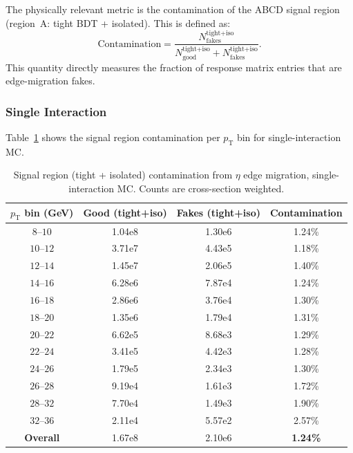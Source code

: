 \documentclass[11pt,letterpaper]{article}
\providecommand{\num}[1]{#1}  %
\newcommand{\pT}{\ensuremath{p_{\text{T}}}}
\begin{document}
The physically relevant metric is the contamination of the ABCD signal region
(region~A: tight BDT + isolated). This is defined as:
\begin{equation}
  \text{Contamination} = \frac{N_\text{fakes}^\text{tight+iso}}{N_\text{good}^\text{tight+iso} + N_\text{fakes}^\text{tight+iso}}.
  \label{eq:contamination}
\end{equation}
This quantity directly measures the fraction of response matrix entries that are
edge-migration fakes.

\subsubsection{Single Interaction}

Table~\ref{tab:signal_single} shows the signal region contamination per $\pT$
bin for single-interaction MC.

\begin{table}[htbp]
\centering
\caption{Signal region (tight + isolated) contamination from $\eta$ edge
  migration, single-interaction MC. Counts are cross-section weighted.}
\label{tab:signal_single}
\begin{tabular}{cccc}
\toprule
$\pT$ bin (GeV) & Good (tight+iso) & Fakes (tight+iso) & Contamination \\
\midrule
$8$--$10$   & \num{1.04e8} & \num{1.30e6} & 1.24\% \\
$10$--$12$  & \num{3.71e7} & \num{4.43e5} & 1.18\% \\
$12$--$14$  & \num{1.45e7} & \num{2.06e5} & 1.40\% \\
$14$--$16$  & \num{6.28e6} & \num{7.87e4} & 1.24\% \\
$16$--$18$  & \num{2.86e6} & \num{3.76e4} & 1.30\% \\
$18$--$20$  & \num{1.35e6} & \num{1.79e4} & 1.31\% \\
$20$--$22$  & \num{6.62e5} & \num{8.68e3} & 1.29\% \\
$22$--$24$  & \num{3.41e5} & \num{4.42e3} & 1.28\% \\
$24$--$26$  & \num{1.79e5} & \num{2.34e3} & 1.30\% \\
$26$--$28$  & \num{9.19e4} & \num{1.61e3} & 1.72\% \\
$28$--$32$  & \num{7.70e4} & \num{1.49e3} & 1.90\% \\
$32$--$36$  & \num{2.11e4} & \num{5.57e2} & 2.57\% \\
\midrule
\textbf{Overall} & \num{1.67e8} & \num{2.10e6} & \textbf{1.24\%} \\
\bottomrule
\end{tabular}
\end{table}
\end{document}

